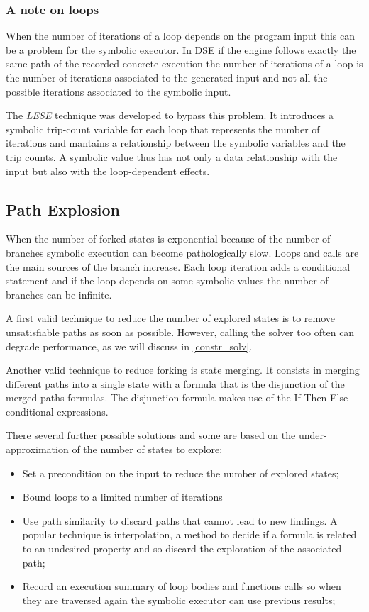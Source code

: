 \subsubsection{A note on loops}

When the number of iterations of a loop depends on the program input this can be a problem for the symbolic executor. In DSE if the engine follows exactly the same path of the recorded concrete execution the number of iterations of a loop is the number of iterations associated to the generated input and not all the possible iterations associated to the symbolic input.

The {\em LESE} \cite{Saxena:EECS-2009-34} technique was developed to bypass this problem. It introduces a symbolic trip-count variable for each loop that represents the number of iterations and mantains a relationship between the symbolic variables and the trip counts. A symbolic value thus has not only a data relationship with the input but also with the loop-dependent effects.

\subsection{Path Explosion}

When the number of forked states is exponential because of the number of branches symbolic execution can become pathologically slow.
Loops and calls are the main sources of the branch increase. Each loop iteration adds a conditional statement and if the loop depends on some symbolic values the number of branches can be infinite.

A first valid technique to reduce the number of explored states is to remove unsatisfiable paths as soon as possible. However, calling the solver too often can degrade performance, as we will discuss in \ref{constr_solv}.

Another valid technique to reduce forking is state merging. It consists in merging different paths into a single state with a formula that is the disjunction of the merged paths formulas. The disjunction formula makes use of the If-Then-Else conditional expressions.

There several further possible solutions and some are based on the under-approximation of the number of states to explore:

\begin{itemize}
\item Set a precondition on the input to reduce the number of explored states;
\item Bound loops to a limited number of iterations
\item Use path similarity to discard paths that cannot lead to new findings. A popular technique is interpolation, a method to decide if a formula is related to an undesired property and so discard the exploration of the associated path;
\item Record an execution summary of loop bodies and functions calls so when they are traversed again the symbolic executor can use previous results;
\end{itemize}

